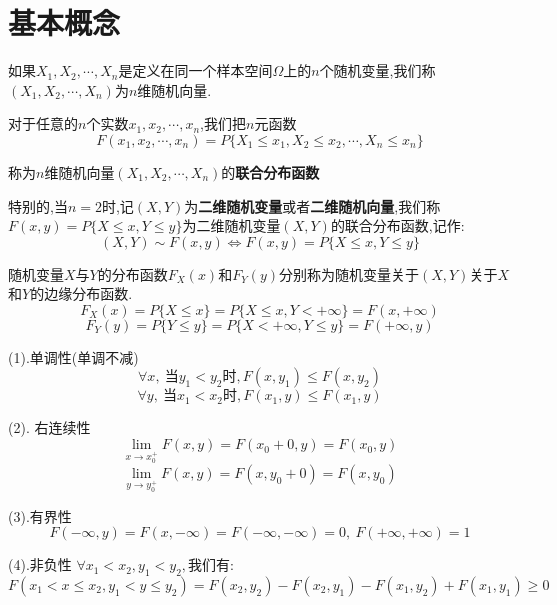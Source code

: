 \section{基本概念}
\begin{definition}[$n$维随机变量]
	如果$X_{1},X_{2},\cdots,X_{n}$是定义在同一个样本空间$\Omega$上的$n$个随机变量,我们称$(X_{1},X_{2},\cdots,X_{n})$为$n$维随机向量.
	
	对于任意的$n$个实数$x_{1},x_{2},\cdots,x_{n}$,我们把$n$元函数
	$$F(x_{1},x_{2},\cdots,x_{n})=P\{X_{1}\leq x_{1},X_{2}\leq x_{2},\cdots,X_{n}\leq x_{n}\}$$
	
	称为$n$维随机向量$(X_{1},X_{2},\cdots,X_{n})$的\textbf{联合分布函数}
	
	特别的,当$n=2$时,记$(X,Y)$为\textbf{二维随机变量}或者\textbf{二维随机向量},我们称$F(x,y)=P\{X\leq x,Y\leq y\}$为二维随机变量$(X,Y)$的联合分布函数,记作: 
	$$(X,Y)\sim F(x,y)\Leftrightarrow F(x,y)=P\{X\leq x,Y\leq y\}$$
	
	随机变量$X$与$Y$的分布函数$F_{X}(x)$和$F_{Y}(y)$分别称为随机变量关于$(X,Y)$关于$X$和$Y$的边缘分布函数.
	$$F_{X}(x)=P\{X\leq x\}=P\{X\leq x,Y< +\infty\}=F(x,+\infty)$$
	$$F_{Y}(y)=P\{Y\leq y\}=P\{X<+\infty,Y\leq y\}=F(+\infty,y)$$
	\begin{anymark}[注]
		
		(1).单调性(单调不减)
		$$\forall x,\ \text{当}y_{1}<y_{2}\text{时},F(x,y_{1})\leq F(x,y_{2})$$
		$$\forall y,\ \text{当}x_{1}<x_{2}\text{时},F(x_{1},y)\leq F(x_{1},y)$$
		
		(2). 右连续性
		$$\lim\limits_{x\rightarrow x_{0}^{+}}F(x,y)=F(x_{0}+0,y)=F(x_{0},y)$$
		$$\lim\limits_{y\rightarrow y_{0}^{+}}F(x,y)=F(x,y_{0}+0)=F(x,y_{0})$$
		
		(3).有界性
		$$F(-\infty,y)=F(x,-\infty)=F(-\infty,-\infty)=0,\ F(+\infty,+\infty)=1$$
		
		(4).非负性
		$\forall x_{1}<x_{2},y_{1}<y_{2},\text{我们有}$: 
		$$F(x_{1}<x\leq x_{2},y_{1}<y\leq y_{2})=F(x_{2},y_{2})-F(x_{2},y_{1})-F(x_{1},y_{2})+F(x_{1},y_{1})\geq 0$$
	\end{anymark}
	
\end{definition}


